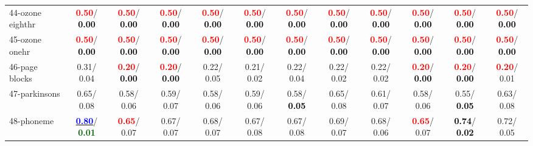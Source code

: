 \begin{table}[h]
\begin{center}
{\begin{tabular}{lc|c|c|c|c|c|c|c|c|c|c}
44-ozone eighthr & \textcolor{red}{\textbf{  0.50}}/\textcolor{black}{\textbf{  0.00}} & \textcolor{red}{\textbf{  0.50}}/\textcolor{black}{\textbf{  0.00}} & \textcolor{red}{\textbf{  0.50}}/\textcolor{black}{\textbf{  0.00}} & \textcolor{red}{\textbf{  0.50}}/\textcolor{black}{\textbf{  0.00}} & \textcolor{red}{\textbf{  0.50}}/\textcolor{black}{\textbf{  0.00}} & \textcolor{red}{\textbf{  0.50}}/\textcolor{black}{\textbf{  0.00}} & \textcolor{red}{\textbf{  0.50}}/\textcolor{black}{\textbf{  0.00}} & \textcolor{red}{\textbf{  0.50}}/\textcolor{black}{\textbf{  0.00}} & \textcolor{red}{\textbf{  0.50}}/\textcolor{black}{\textbf{  0.00}} & \textcolor{red}{\textbf{  0.50}}/\textcolor{black}{\textbf{  0.00}} & \textcolor{red}{\textbf{  0.50}}/\textcolor{black}{\textbf{  0.00}} \\
45-ozone onehr & \textcolor{red}{\textbf{  0.50}}/\textcolor{black}{\textbf{  0.00}} & \textcolor{red}{\textbf{  0.50}}/\textcolor{black}{\textbf{  0.00}} & \textcolor{red}{\textbf{  0.50}}/\textcolor{black}{\textbf{  0.00}} & \textcolor{red}{\textbf{  0.50}}/\textcolor{black}{\textbf{  0.00}} & \textcolor{red}{\textbf{  0.50}}/\textcolor{black}{\textbf{  0.00}} & \textcolor{red}{\textbf{  0.50}}/\textcolor{black}{\textbf{  0.00}} & \textcolor{red}{\textbf{  0.50}}/\textcolor{black}{\textbf{  0.00}} & \textcolor{red}{\textbf{  0.50}}/\textcolor{black}{\textbf{  0.00}} & \textcolor{red}{\textbf{  0.50}}/\textcolor{black}{\textbf{  0.00}} & \textcolor{red}{\textbf{  0.50}}/\textcolor{black}{\textbf{  0.00}} & \textcolor{red}{\textbf{  0.50}}/\textcolor{black}{\textbf{  0.00}} \\
46-page blocks &   0.31/  0.04 & \textcolor{red}{\textbf{  0.20}}/\textcolor{black}{\textbf{  0.00}} & \textcolor{red}{\textbf{  0.20}}/\textcolor{black}{\textbf{  0.00}} &   0.22/  0.05 &   0.21/  0.02 &   0.22/  0.04 &   0.22/  0.02 &   0.22/  0.02 & \textcolor{red}{\textbf{  0.20}}/\textcolor{black}{\textbf{  0.00}} & \textcolor{red}{\textbf{  0.20}}/\textcolor{black}{\textbf{  0.00}} & \textcolor{red}{\textbf{  0.20}}/  0.01 \\ \hline
47-parkinsons &   0.65/  0.08 &   0.58/  0.06 &   0.59/  0.07 &   0.58/  0.06 &   0.59/  0.06 &   0.58/\textcolor{black}{\textbf{  0.05}} &   0.65/  0.08 &   0.61/  0.07 &   0.58/  0.06 &   0.55/\textcolor{black}{\textbf{  0.05}} &   0.63/  0.08 \\
48-phoneme & \underline{\textcolor{blue}{\textbf{  0.80}}}/\textcolor{darkgreen}{\textbf{  0.01}} & \textcolor{red}{\textbf{  0.65}}/  0.07 &   0.67/  0.07 &   0.68/  0.07 &   0.67/  0.08 &   0.67/  0.08 &   0.69/  0.07 &   0.68/  0.06 & \textcolor{red}{\textbf{  0.65}}/  0.07 & \textcolor{black}{\textbf{  0.74}}/\textcolor{black}{\textbf{  0.02}} &   0.72/  0.05 \\

\end{tabular}}
\end{center}
\end{table}
